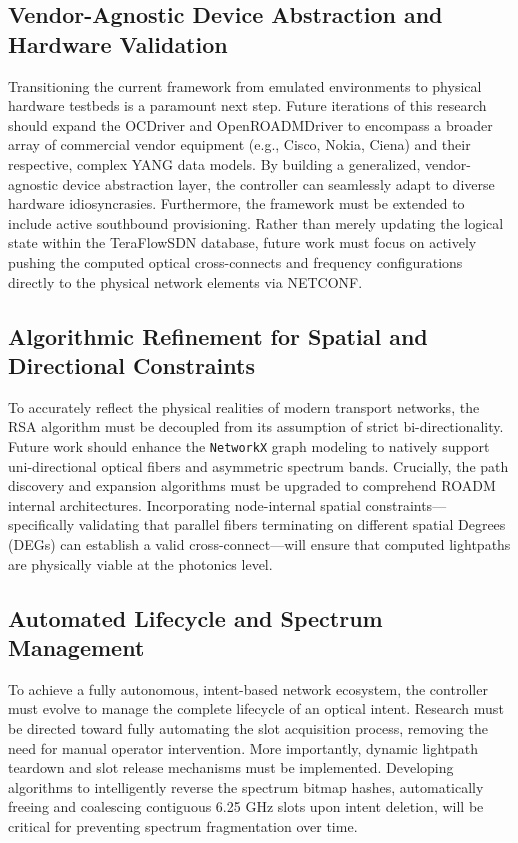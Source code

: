 \subsection*{\small Vendor-Agnostic Device Abstraction and Hardware Validation}
Transitioning the current framework from emulated environments to physical hardware testbeds is a paramount next step. Future iterations of this research should expand the OCDriver and OpenROADMDriver to encompass a broader array of commercial vendor equipment (e.g., Cisco, Nokia, Ciena) and their respective, complex YANG data models. By building a generalized, vendor-agnostic device abstraction layer, the controller can seamlessly adapt to diverse hardware idiosyncrasies. Furthermore, the framework must be extended to include active southbound provisioning. Rather than merely updating the logical state within the TeraFlowSDN database, future work must focus on actively pushing the computed optical cross-connects and frequency configurations directly to the physical network elements via NETCONF.
\subsection*{\small Algorithmic Refinement for Spatial and Directional Constraints}
To accurately reflect the physical realities of modern transport networks, the RSA algorithm must be decoupled from its assumption of strict bi-directionality. Future work should enhance the \texttt{NetworkX} graph modeling to natively support uni-directional optical fibers and asymmetric spectrum bands. Crucially, the path discovery and expansion algorithms must be upgraded to comprehend ROADM internal architectures. Incorporating node-internal spatial constraints—specifically validating that parallel fibers terminating on different spatial Degrees (DEGs) can establish a valid cross-connect—will ensure that computed lightpaths are physically viable at the photonics level.
\subsection*{\small Automated Lifecycle and Spectrum Management}
To achieve a fully autonomous, intent-based network ecosystem, the controller must evolve to manage the complete lifecycle of an optical intent. Research must be directed toward fully automating the slot acquisition process, removing the need for manual operator intervention. More importantly, dynamic lightpath teardown and slot release mechanisms must be implemented. Developing algorithms to intelligently reverse the spectrum bitmap hashes, automatically freeing and coalescing contiguous 6.25 GHz slots upon intent deletion, will be critical for preventing spectrum fragmentation over time.
